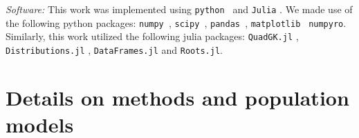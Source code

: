 \documentclass[twocolumn,usenames,dvipsnames,linenumbers]{aastex631}
\begin{document}
 \textit{Software: } This work was implemented using \texttt{python }\citep{Python3} and  \texttt{Julia} \citep{Julia-2017}. 
 We made use of the following python packages: \texttt{numpy }\citep{numpy},  \texttt{scipy }\citep{scipy},  \texttt{pandas }\citep{pandas},  \texttt{matplotlib }\citep{matplotlib} \texttt{numpyro}.
Similarly, this work utilized the following julia packages: \texttt{QuadGK.jl} \citep{quadgk}, \texttt{Distributions.jl} \citep{JSSv098i16,Distributions.jl-2019}, \texttt{DataFrames.jl} \citep{JSSv107i04} and \texttt{Roots.jl}\citep{Roots.jl}.

\appendix

\section{Details on methods and population models}
\label{sec:MethodsAppx}
\end{document}
